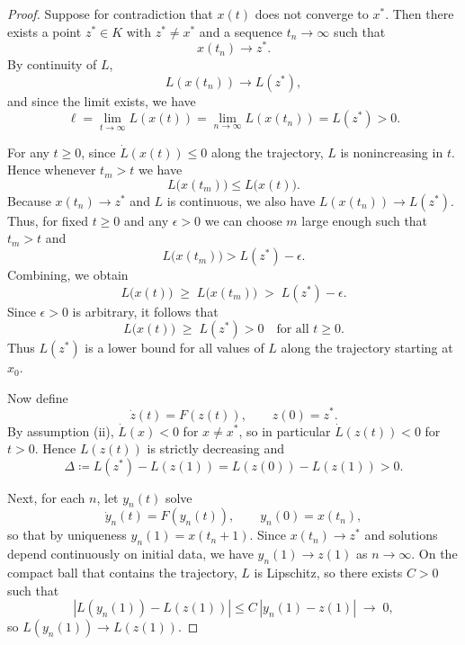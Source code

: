 \documentclass{tufte-handout}
\theoremstyle{definition}
\begin{document}
\begin{proof}
	Suppose for contradiction that $x(t)$ does not converge to $x^*$.
	Then there exists a point $z^*\in K$ with $z^*\neq x^*$ and a sequence
	$t_n\to\infty$ such that
	\[
	  x(t_n)\to z^*.
	\]
	By continuity of $L$,
	\[
	  L(x(t_n)) \to L(z^*),
	\]
	and since the limit exists, we have
	\[
	  \ell = \lim_{t\to\infty} L(x(t))
		   = \lim_{n\to\infty} L(x(t_n))
		   = L(z^*) > 0.
	\]
	
	For any $t\ge 0$, since $\dot L(x(t))\le 0$ along the trajectory, $L$ is
	nonincreasing in $t$. Hence whenever $t_m>t$ we have
	\[
	  L\bigl(x(t_m)\bigr) \le L\bigl(x(t)\bigr).
	\]
	Because $x(t_n)\to z^*$ and $L$ is continuous, we also have
	$L(x(t_n))\to L(z^*)$. Thus, for fixed $t\ge 0$ and any $\epsilon>0$ we can
	choose $m$ large enough such that $t_m>t$ and
	\[
	  L\bigl(x(t_m)\bigr) > L(z^*) - \epsilon.
	\]
	Combining, we obtain
	\[
	  L\bigl(x(t)\bigr) \;\ge\; L\bigl(x(t_m)\bigr) \;>\; L(z^*) - \epsilon.
	\]
	Since $\epsilon>0$ is arbitrary, it follows that
	\begin{equation}
	  L\bigl(x(t)\bigr) \;\ge\; L(z^*) > 0
	  \quad\text{for all } t\ge 0.
	  \label{11-18-1}
	\end{equation}
	Thus $L(z^*)$ is a lower bound for all values of $L$ along the trajectory
	starting at $x_0$.

	Now define
	\[
	  \dot z(t) = F(z(t)), \qquad z(0)=z^*.
	\]
By assumption (ii), $\dot L(x)<0$ for $x\ne x^*$, so in particular
	$\dot L(z(t))<0$ for $t>0$.
	Hence $L(z(t))$ is strictly decreasing and
	\[
	  \Delta \coloneqq L(z^*) - L(z(1)) = L(z(0)) - L(z(1)) > 0.
	\]

	Next, for each $n$, let $y_n(t)$ solve
	\[
	  \dot y_n(t) = F(y_n(t)), \qquad y_n(0)=x(t_n),
	\]
	so that by uniqueness $y_n(1)=x(t_n+1)$. Since $x(t_n)\to z^*$ and solutions
	depend continuously on initial data, we have $y_n(1)\to z(1)$ as $n\to\infty$.
	On the compact ball that contains the trajectory, $L$ is Lipschitz, so there
	exists $C>0$ such that
	\[
	  |L(y_n(1)) - L(z(1))|
	  \le C\,|y_n(1)-z(1)| \;\longrightarrow\; 0,
	\]
	so $L(y_n(1)) \to L(z(1))$.


\end{proof}
\end{document}
